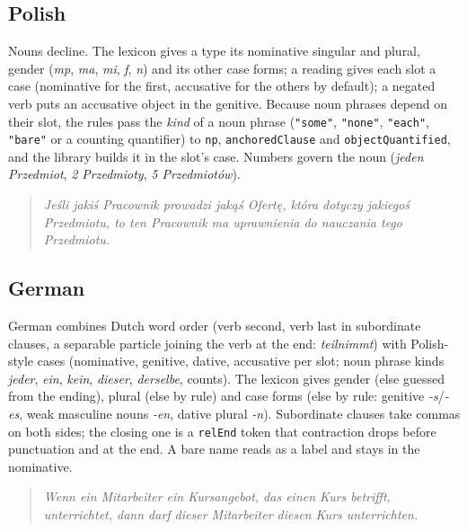 \documentclass[11pt, a4paper]{article}
\newcommand{\code}[1]{\texttt{\color{codefg}#1}}
\begin{document}
\subsection{Polish}

Nouns decline. The lexicon gives a type its nominative singular and plural,
gender (\textit{mp}, \textit{ma}, \textit{mi}, \textit{f}, \textit{n}) and its
other case forms; a reading gives each slot a case (nominative for the
first, accusative for the others by default); a negated verb puts an
accusative object in the genitive. Because noun phrases depend on their
slot, the rules pass the \emph{kind} of a noun phrase (\code{"some"},
\code{"none"}, \code{"each"}, \code{"bare"} or a counting quantifier) to
\code{np}, \code{anchoredClause} and \code{objectQuantified}, and the library
builds it in the slot's case. Numbers govern the noun (\textit{jeden
Przedmiot}, \textit{2 Przedmioty}, \textit{5 Przedmiotów}).

\begin{quote}
\textit{Jeśli jakiś Pracownik prowadzi jakąś Ofertę, która dotyczy jakiegoś
Przedmiotu, to ten Pracownik ma uprawnienia do nauczania tego Przedmiotu.}
\end{quote}

\subsection{German}

German combines Dutch word order (verb second, verb last in subordinate
clauses, a separable particle joining the verb at the end:
\textit{teilnimmt}) with Polish-style cases (nominative, genitive, dative,
accusative per slot; noun phrase kinds \textit{jeder}, \textit{ein},
\textit{kein}, \textit{dieser}, \textit{derselbe}, counts). The lexicon
gives gender (else guessed from the ending), plural (else by rule) and case
forms (else by rule: genitive \textit{-s}/\textit{-es}, weak masculine nouns
\textit{-en}, dative plural \textit{-n}). Subordinate clauses take commas on
both sides; the closing one is a \code{relEnd} token that contraction drops
before punctuation and at the end. A bare name reads as a label and stays in
the nominative.

\begin{quote}
\textit{Wenn ein Mitarbeiter ein Kursangebot, das einen Kurs betrifft,
unterrichtet, dann darf dieser Mitarbeiter diesen Kurs unterrichten.}
\end{quote}

\end{document}
